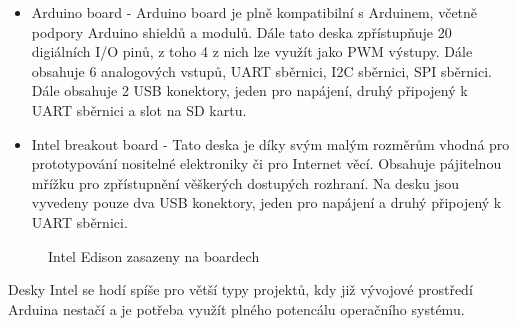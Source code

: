 			\begin{itemize}
				\item Arduino board - Arduino board je plně kompatibilní s Arduinem, včetně podpory Arduino shieldů a modulů. Dále tato deska zpřístupňuje 20 digiálních I/O pinů, z toho 4 z nich lze využít jako PWM výstupy. Dále obsahuje 6 analogových vstupů, UART sběrnici, I2C sběrnici, SPI sběrnici. Dále obsahuje 2 USB konektory, jeden pro napájení, druhý připojený k UART sběrnici a slot na SD kartu.
				\item Intel breakout board -  Tato deska je díky svým malým rozměrům vhodná pro prototypování nositelné elektroniky či pro Internet věcí. Obsahuje pájitelnou mřížku pro zpřístupnění věškerých dostupých rozhraní. Na desku jsou vyvedeny pouze dva USB konektory, jeden pro napájení a druhý připojený k UART sběrnici.
\end{itemize}


\begin{figure}[!ht]
    \centering
			\hspace*{5mm}
		\caption{Intel Edison zasazeny na boardech}
\end{figure}
	

Desky Intel se hodí spíše pro větší typy projektů, kdy již vývojové prostředí Arduina nestačí a je potřeba využít plného potencálu operačního systému.



